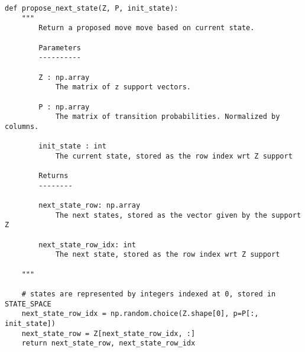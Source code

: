 \begin{verbatim}
def propose_next_state(Z, P, init_state):
    """
        Return a proposed move move based on current state.

        Parameters
        ----------
            
        Z : np.array
            The matrix of z support vectors.
            
        P : np.array
            The matrix of transition probabilities. Normalized by columns.
            
        init_state : int
            The current state, stored as the row index wrt Z support
            
        Returns
        --------
        
        next_state_row: np.array
            The next states, stored as the vector given by the support Z
            
        next_state_row_idx: int
            The next state, stored as the row index wrt Z support 
        
    """
    
    # states are represented by integers indexed at 0, stored in STATE_SPACE
    next_state_row_idx = np.random.choice(Z.shape[0], p=P[:, init_state])
    next_state_row = Z[next_state_row_idx, :]
    return next_state_row, next_state_row_idx
\end{verbatim}